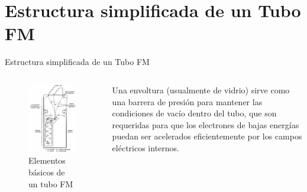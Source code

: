 \documentclass[a4paper,10pt]{beamer}
\begin{document}
\section{Estructura simplificada de un Tubo FM}
\begin{frame}[allowframebreaks]{Estructura simplificada de un Tubo FM}
 
 \begin{columns}[c]
  \column{1.6in}
  \begin{figure}
  \center
   \includegraphics[scale=0.32]{fig2}
   \caption{Elementos básicos de un tubo FM}
  \end{figure}

  \column{2.4in}
  \begin{justify}
   
   \footnotesize{Una envoltura (usualmente de vidrio) sirve como una barrera de presión
   para mantener las condiciones de vacío dentro del tubo, que son requeridas
   para que los electrones de bajas energías puedan ser acelerados eficientemente
   por los campos eléctricos internos.
   
   \vspace{.3cm}
   
}
\end{justify}
\end{columns}
\end{frame}
\end{document}
